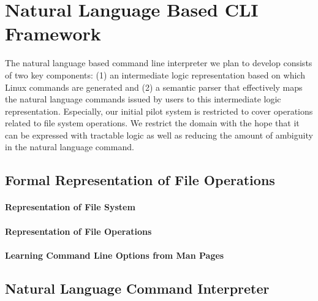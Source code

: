 \section{Natural Language Based CLI Framework}

The natural language based command line interpreter we plan to develop consists of two key components: (1) an intermediate logic representation based on which Linux commands are generated and (2) a semantic parser that effectively maps the natural language commands issued by users to this intermediate logic representation. Especially, our initial pilot system is restricted to cover operations related to file system operations. We restrict the domain with the hope that it can be expressed with tractable logic as well as reducing the amount of ambiguity in the natural language command.

\subsection{Formal Representation of File Operations}
\paragraph{Representation of File System}
\paragraph{Representation of File Operations}
\paragraph{Learning Command Line Options from Man Pages}

\subsection{Natural Language Command Interpreter}